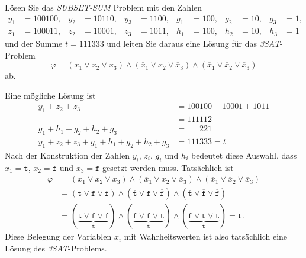 Lösen Sie das \textit{SUBSET-SUM} Problem mit den Zahlen
\begin{align*}
y_1&=100100,&
y_2&=10110,&
y_3&=1100,&
g_1&=100,&
g_2&=10,&
g_3&=1,
\\
z_1&=100011,&
z_2&=10001,&
z_3&=1011,&
h_1&=100,&
h_2&=10,&
h_3&=1
\end{align*}
und der Summe $t=111333$ und leiten Sie daraus eine Lösung für 
das \textit{3SAT}-Problem
\[
\varphi
=
(x_1\vee x_2\vee x_3)
\wedge
(\overline{x}_1\vee x_2\vee \overline{x}_3)
\wedge
(\overline{x}_1\vee \overline{x}_2\vee \overline{x}_3)
\]
ab.

\begin{loesung}
Eine mögliche Lösung ist
\begin{align*}
y_1+z_2+z_3
&=
100100+10001+1011
\\
&=111112
\\
g_1+h_1+g_2+h_2+g_3
&= \phantom{000}221
\\
y_1+z_2+z_3
+
g_1+h_1+g_2+h_2+g_3
&=
111333=t
\end{align*}
Nach der Konstruktion der Zahlen $y_i$, $z_i$, $g_i$ und $h_i$ bedeutet
diese Auswahl, dass $x_1=\texttt{t}$, $x_2=\texttt{f}$ und
$x_3=\texttt{f}$ gesetzt werden muss.
Tatsächlich ist
\begin{align*}
\varphi
&=
(x_1\vee x_2\vee x_3)
\wedge
(\overline{x}_1\vee x_2\vee \overline{x}_3)
\wedge
(\overline{x}_1\vee \overline{x}_2\vee \overline{x}_3)
\\
&=
(
\texttt{t}
\vee
\texttt{f}
\vee
\texttt{f}
)
\wedge
(
\overline{\texttt{t}}
\vee
\texttt{f}
\vee
\overline{\texttt{f}}
)
\wedge
(
\overline{\texttt{t}}
\vee
\overline{\texttt{f}}
\vee
\overline{\texttt{f}}
)
\\
&=
(
\underbrace{
\texttt{t}
\vee
\texttt{f}
\vee
\texttt{f}
}_{\displaystyle \texttt{t}}
)
\wedge
(
\underbrace{
\texttt{f}
\vee
\texttt{f}
\vee
\texttt{t}
}_{\displaystyle \texttt{t}}
)
\wedge
(
\underbrace{
\texttt{f}
\vee
\texttt{t}
\vee
\texttt{t}
}_{\displaystyle \texttt{t}}
)
=
\texttt{t}.
\end{align*}
Diese Belegung der Variablen $x_i$ mit Wahrheitswerten ist also
tatsächlich eine Lösung des \textit{3SAT}-Problems.
\end{loesung}
